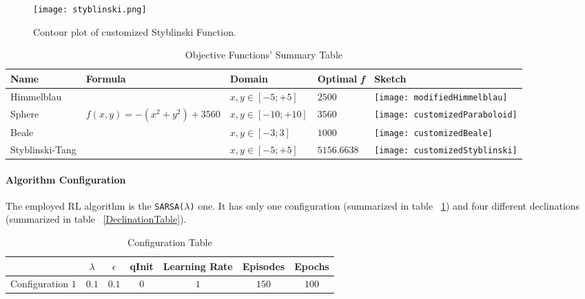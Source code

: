 \begin{figure}[h!]
	\centering
	\texttt{[image: styblinski.png]}
	\caption{Contour plot of customized Styblinski Function.}
	\label{fig:ContourStyblinskiFunction}
\end{figure}



	
\begin{sidewaystable}
	\centering
	\caption{Objective Functions'  Summary Table}
	\begin{tabular}
		{l l l l l} \hline Name & Formula & Domain & Optimal \textit{f} & Sketch \\
		\hline Himmelblau & \vtop{\hbox{\strut $f(x, y) = - ((x^2 + y -11)^2+$}\hbox{\strut $+(x + y^2 - 7)^2) + 2500$}} & $x, y \in [-5;+5]$ & $2500$ & \parbox[c]{1em}{
			\texttt{[image: modifiedHimmelblau]}} \\
		Sphere & $f(x, y) = -(x^2 + y^2) + 3560$ &$x, y \in [-10;+10]$ & $3560$ & \parbox[c]{1em}{
			\texttt{[image: customizedParaboloid]}} \\
		Beale &  &$x, y \in [-3;3]$ & $1000$ & \parbox[c]{1em}{
			\texttt{[image: customizedBeale]}} \\
		Styblinski-Tang &  &$x, y \in [-5;+5]$ & $5156.6638$ & \parbox[c]{1em}{
			\texttt{[image: customizedStyblinski]}} \\
		\hline
	\end{tabular}
\end{sidewaystable}

\pagebreak

\paragraph{Algorithm Configuration} The employed RL algorithm is the {\tt SARSA($\lambda$)} one. It has only one configuration (summarized in table ~\ref{ConfigurationTable}) and four different declinations (summarized in table ~\ref{DeclinationTable}).

\begin{table} [h!]
	\centering	
	\begin{tabular}{|c|c|c|c|c|c|c|}
		\hline 
		& \textbf{$\lambda$}  & \textbf{$\epsilon$} & \textbf{qInit} & \textbf{Learning Rate}  & \textbf{Episodes}  & \textbf{Epochs} \\ 
		\hline Configuration $1$
		& $0.1$ & $0.1$ & $0$ & $1$  & $150$ & $100$  \\ 
		\hline
	\end{tabular}
\caption{Configuration Table}
\label{ConfigurationTable}
\end{table}

